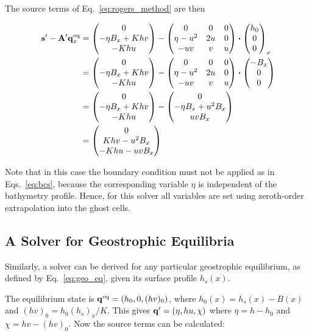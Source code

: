 The source terms of Eq.~\ref{eq:rogers_method} are then

\begin{align}
  \vb s' - \vb A' \eq{\vb q}_x
  &= \mqty(0 \\ -\eta B_x + K h v \\ - K h u) - \mqty(
    0 & 0 & 0 \\
    \eta - u^2 & 2u & 0 \\
    -uv & v & u
  ) \vdot \mqty(h_0 \\ 0 \\ 0)_x \\
  &= \mqty(0 \\ -\eta B_x + K h v \\ - K h u) - \mqty(
    0 & 0 & 0 \\
    \eta - u^2 & 2u & 0 \\
    -uv & v & u
  ) \vdot \mqty(- B_x \\ 0 \\ 0) \\
  &= \mqty(0 \\ -\eta B_x + K h v \\ - K h u) - \mqty(0 \\ - \eta B_x + u^2 B_x \\ uv B_x) \\
  &= \mqty(0 \\ K h v - u^2 B_x \\ - K h u - u v B_x )
\end{align}

Note that in this case the boundary condition must not be applied as in Eqs.~\ref{eq:bcs}, because the corresponding variable $\eta$ is independent of the bathymetry profile. Hence, for this solver all variables are set using zeroth-order extrapolation into the ghost cells.

\subsection{A Solver for Geostrophic Equilibria}
\label{sec:rogers_geo}

Similarly, a solver can be derived for any particular geostrophic equilibrium, as defined by Eq.~\ref{eq:geo_eq}, given its surface profile $h_s(x)$.

The equilibrium state is $\vb q^\mathrm{eq} = (h_0, 0, (hv)_0)$, where $h_0(x) = h_s(x) - B(x)$ and $(hv)_0 = h_0 (h_s)_x / K$. This gives $\vb q' = (\eta, hu, \chi)$ where $\eta = h - h_0$ and $\chi = hv - (hv)_0$. Now the source terms can be calculated:

